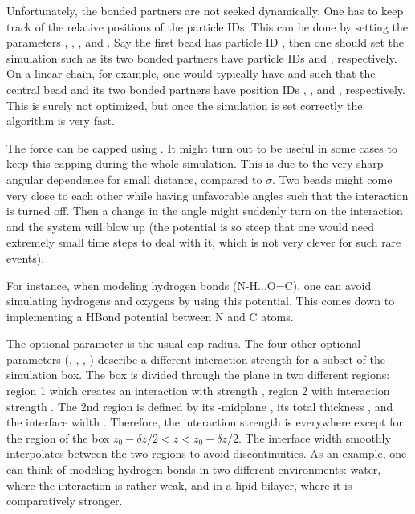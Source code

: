 Unfortunately, the bonded partners are not seeked dynamically. One has to keep
track of the relative positions of the particle IDs. This can be done by
setting the parameters , , , and . Say
the first bead  has particle ID , then one should set the
simulation such as its two bonded partners have particle IDs  and
, respectively. On a linear chain, for example, one would
typically have  and  such that the central bead and
its two bonded partners have position IDs , , and ,
respectively. This is surely not optimized, but once the simulation is set
correctly the algorithm is very fast.

The force can be capped using . It might turn out
to be useful in some cases to keep this capping during the whole
simulation. This is due to the very sharp angular dependence for small
distance, compared to $\sigma$. Two beads might come very close to each other
while having unfavorable angles such that the interaction is turned off. Then
a change in the angle might suddenly turn on the interaction and the system
will blow up (the potential is so steep that one would need extremely small
time steps to deal with it, which is not very clever for such rare events).

For instance, when modeling hydrogen bonds (N-H...O=C), one can avoid
simulating hydrogens and oxygens by using this potential. This comes down to
implementing a HBond potential between N and C atoms.

The optional parameter  is the usual cap radius. The four
other optional parameters (, , \var{\kappa},
) describe a different interaction strength  for
a subset of the simulation box. The box is divided through the  plane
in two different regions: region 1 which creates an interaction with strength
\var{\epsilon}, region 2 with interaction strength . The 2nd
region is defined by its -midplane , its total thickness
, and the interface width \var{\kappa}. Therefore, the
interaction strength is \var{\epsilon} everywhere except for the region of the
box $z_0-\delta z/2<z<z_0+\delta z/2$. The interface width smoothly
interpolates between the two regions to avoid discontinuities. As an example,
one can think of modeling hydrogen bonds in two different environments: water,
where the interaction is rather weak, and in a lipid bilayer, where it is
comparatively stronger.

